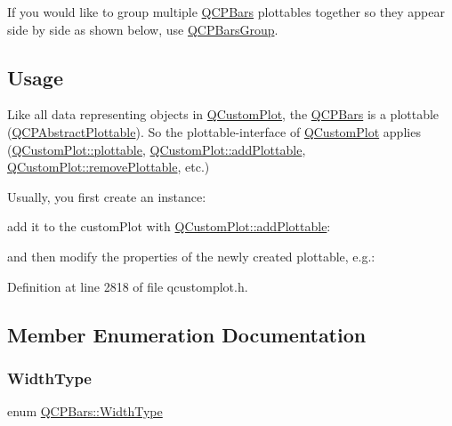 If you would like to group multiple \hyperlink{class_q_c_p_bars}{Q\+C\+P\+Bars} plottables together so they appear side by side as shown below, use \hyperlink{class_q_c_p_bars_group}{Q\+C\+P\+Bars\+Group}.

\hypertarget{class_q_c_p_statistical_box_usage}{}\subsection{Usage}\label{class_q_c_p_statistical_box_usage}
Like all data representing objects in \hyperlink{class_q_custom_plot}{Q\+Custom\+Plot}, the \hyperlink{class_q_c_p_bars}{Q\+C\+P\+Bars} is a plottable (\hyperlink{class_q_c_p_abstract_plottable}{Q\+C\+P\+Abstract\+Plottable}). So the plottable-\/interface of \hyperlink{class_q_custom_plot}{Q\+Custom\+Plot} applies (\hyperlink{class_q_custom_plot_a32de81ff53e263e785b83b52ecd99d6f}{Q\+Custom\+Plot\+::plottable}, \hyperlink{class_q_custom_plot_ab7ad9174f701f9c6f64e378df77927a6}{Q\+Custom\+Plot\+::add\+Plottable}, \hyperlink{class_q_custom_plot_af3dafd56884208474f311d6226513ab2}{Q\+Custom\+Plot\+::remove\+Plottable}, etc.)

Usually, you first create an instance\+: 
\begin{DoxyCodeInclude}
\end{DoxyCodeInclude}
add it to the custom\+Plot with \hyperlink{class_q_custom_plot_ab7ad9174f701f9c6f64e378df77927a6}{Q\+Custom\+Plot\+::add\+Plottable}\+: 
\begin{DoxyCodeInclude}
\end{DoxyCodeInclude}
and then modify the properties of the newly created plottable, e.\+g.\+: 
\begin{DoxyCodeInclude}
\end{DoxyCodeInclude}


Definition at line 2818 of file qcustomplot.\+h.



\subsection{Member Enumeration Documentation}
\mbox{\label{class_q_c_p_bars_a65dbbf1ab41cbe993d71521096ed4649}} 
\subsubsection{\texorpdfstring{Width\+Type}{WidthType}}
{\footnotesize\ttfamily enum \hyperlink{class_q_c_p_bars_a65dbbf1ab41cbe993d71521096ed4649}{Q\+C\+P\+Bars\+::\+Width\+Type}}

